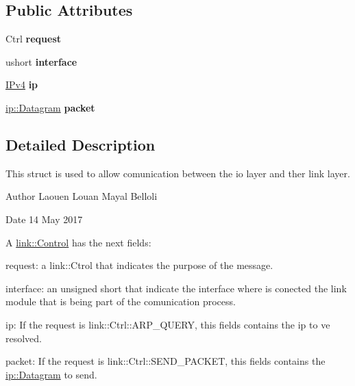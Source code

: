 \subsection*{Public Attributes}
\begin{DoxyCompactItemize}
\item 
Ctrl {\bfseries request}\hypertarget{structlink_1_1Control_afb4bed2321bc90a524872e03126342e9}{}\label{structlink_1_1Control_afb4bed2321bc90a524872e03126342e9}

\item 
ushort {\bfseries interface}\hypertarget{structlink_1_1Control_a9ad3f2480082b69e5b8ab59c4f04c6a3}{}\label{structlink_1_1Control_a9ad3f2480082b69e5b8ab59c4f04c6a3}

\item 
\hyperlink{structIPv4}{I\+Pv4} {\bfseries ip}\hypertarget{structlink_1_1Control_a0b7fcf55d5c517914373a1979fc87277}{}\label{structlink_1_1Control_a0b7fcf55d5c517914373a1979fc87277}

\item 
\hyperlink{structip_1_1Datagram}{ip\+::\+Datagram} {\bfseries packet}\hypertarget{structlink_1_1Control_aa67780caf362cd49f34b9357a2d86999}{}\label{structlink_1_1Control_aa67780caf362cd49f34b9357a2d86999}

\end{DoxyCompactItemize}


\subsection{Detailed Description}
This struct is used to allow comunication between the io layer and ther link layer. 

\begin{DoxyAuthor}{Author}
Laouen Louan Mayal Belloli 
\end{DoxyAuthor}
\begin{DoxyDate}{Date}
14 May 2017
\end{DoxyDate}
A \hyperlink{structlink_1_1Control}{link\+::\+Control} has the next fields\+:
\begin{DoxyEnumerate}
\item request\+: a link\+::\+Ctrol that indicates the purpose of the message.
\item interface\+: an unsigned short that indicate the interface where is conected the link module that is being part of the comunication process.
\item ip\+: If the request is link\+::\+Ctrl\+::\+A\+R\+P\+\_\+\+Q\+U\+E\+RY, this fields contains the ip to ve resolved.
\item packet\+: If the request is link\+::\+Ctrl\+::\+S\+E\+N\+D\+\_\+\+P\+A\+C\+K\+ET, this fields contains the \hyperlink{structip_1_1Datagram}{ip\+::\+Datagram} to send. 
\end{DoxyEnumerate}


